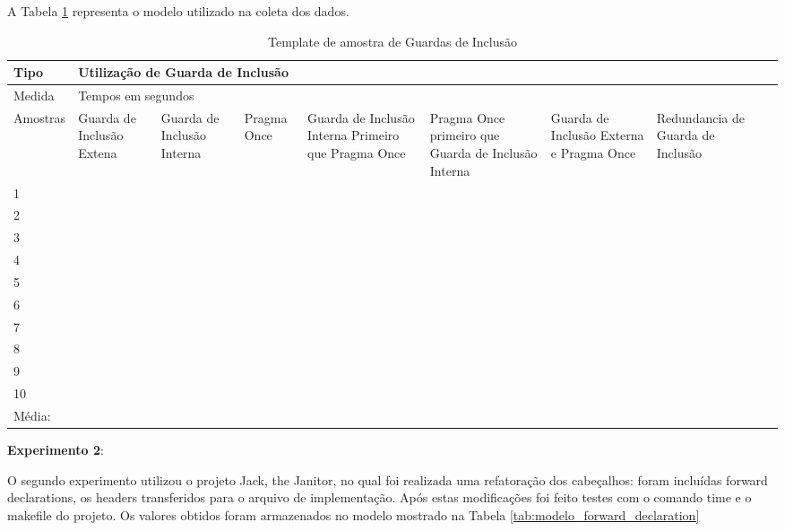 A Tabela \ref{tab:modelo_guards} representa o modelo utilizado na coleta dos
 dados.


\begin{table}[h]
\centering
\begin{tabular}{|l|p{1.5cm}|p{1.5cm}|p{1.5cm}|p{1.5cm}|p{2cm}|p{2cm}|p{2cm}|p{2cm}|}
\hline
Tipo & \multicolumn{7}{l|}{Utilização de Guarda de Inclusão} \\ \hline
Medida & \multicolumn{7}{l|}{Tempos em segundos } \\ \hline
Amostras & Guarda de Inclusão Extena & Guarda de Inclusão Interna & Pragma Once & Guarda de Inclusão Interna Primeiro que Pragma Once & Pragma Once primeiro que Guarda de Inclusão Interna & Guarda de Inclusão Externa e Pragma Once & Redundancia de Guarda de Inclusão \\ \hline
 1  &  &  &   &   &   &  & \\ \hline
 2  &  &  &   &   &   &  & \\ \hline
 3  &  &  &   &   &   &  & \\ \hline
 4  &  &  &   &   &   &  & \\ \hline
 5  &  &  &   &   &   &  & \\ \hline
 6  &  &  &   &   &   &  & \\ \hline
 7  &  &  &   &   &   &  & \\ \hline 
 8  &  &  &   &   &   &  & \\ \hline
 9  &  &  &   &   &   &  & \\ \hline
 10 &  &  &   &   &   &  & \\ \hline
 Média: &  &  & & &   &  & \\ \hline
\end{tabular}
\caption{Template de amostra de Guardas de Inclusão}
\label{tab:modelo_guards}
\end{table}


\textbf{Experimento 2}:

O segundo experimento utilizou o projeto Jack, the Janitor, no qual foi
 realizada uma refatoração dos cabeçalhos: foram incluídas forward
 declarations, os headers transferidos para o arquivo de
 implementação. Após estas modificações foi feito testes com o comando
 time e o makefile do projeto. Os valores obtidos foram armazenados no
 modelo mostrado na Tabela \ref{tab:modelo_forward_declaration}

